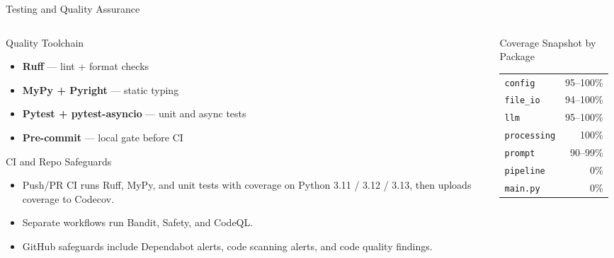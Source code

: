 \documentclass[
        11pt,
        compress,
        xcolor={dvipsnames}
    ]{beamer}
\begin{document}
\begin{frame}{Testing and Quality Assurance}
  \begin{columns}[T]
    \begin{column}{0.50\textwidth}
      \begin{block}{Quality Toolchain}
        \scriptsize
        \begin{itemize}\setlength{\itemsep}{0.3em}
          \item \textbf{Ruff} — lint + format checks
          \item \textbf{MyPy + Pyright} — static typing
          \item \textbf{Pytest + pytest-asyncio} — unit and async tests
          \item \textbf{Pre-commit} — local gate before CI
        \end{itemize}
      \end{block}
      \vspace{0.3em}
      \begin{block}{CI and Repo Safeguards}
        \scriptsize
        \begin{itemize}\setlength{\itemsep}{0.2em}
          \item Push/PR CI runs Ruff, MyPy, and unit tests with coverage on Python 3.11 / 3.12 / 3.13, then uploads coverage to Codecov.
          \item Separate workflows run Bandit, Safety, and CodeQL.
          \item GitHub safeguards include Dependabot alerts, code scanning alerts, and code quality findings.
        \end{itemize}
      \end{block}
    \end{column}
    \begin{column}{0.50\textwidth}
      \begin{block}{Coverage Snapshot by Package}
        \scriptsize
        \begin{tabular}{lr}
          \texttt{config}      & 95--100\% \\
          \texttt{file\_io}    & 94--100\% \\
          \texttt{llm}         & 95--100\% \\
          \texttt{processing}  & 100\% \\
          \texttt{prompt}      & 90--99\% \\
          \midrule
          \texttt{pipeline}    & 0\% \\
          \texttt{main.py}     & 0\% \\

\end{tabular}
\end{block}
\end{column}
\end{columns}
\end{frame}
\end{document}
